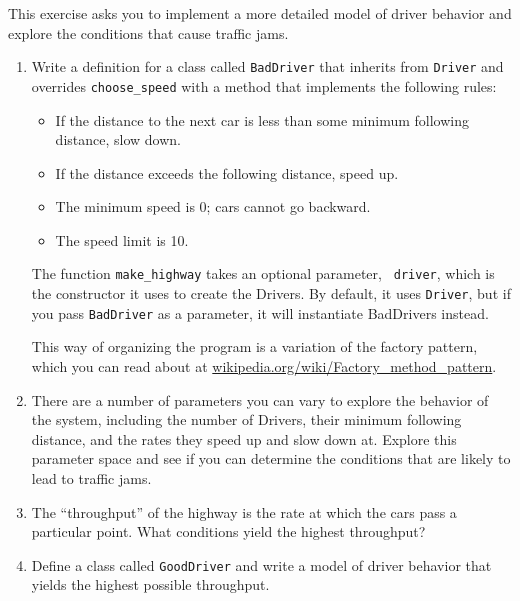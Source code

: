 \documentclass[10pt]{book}
\begin{document}
\begin{ex}

This exercise asks you to implement a more detailed model
of driver behavior and explore the conditions that cause
traffic jams.

\begin{enumerate}

\item Write a definition for a class called {\tt BadDriver}
that inherits from {\tt Driver} and overrides \verb"choose_speed"
with a method that implements the following rules:

\begin{itemize}

\item If the distance to the next car is less than some minimum
following distance, slow down.

\item If the distance exceeds the following distance, speed up.

\item The minimum speed is 0; cars cannot go backward.

\item The speed limit is 10.

\end{itemize}

The function \verb"make_highway" takes an optional parameter, {\tt
  driver}, which is the constructor it uses to create the Drivers.  By
default, it uses {\tt Driver}, but if you pass {\tt BadDriver} as a
parameter, it will instantiate BadDrivers instead.

This way of organizing the program is a variation of the factory
pattern, which you can read about at
\url{wikipedia.org/wiki/Factory_method_pattern}.


\item There are a number of parameters you can vary to explore the
  behavior of the system, including the number of Drivers, their
  minimum following distance, and the rates they speed up and slow
  down at.  Explore this parameter space and see if you can determine
  the conditions that are likely to lead to traffic jams.

\item The ``throughput'' of the highway is the rate at which the cars
  pass a particular point.  What conditions yield the highest
  throughput?

\item Define a class called {\tt GoodDriver} and write a model of
  driver behavior that yields the highest possible throughput.

\end{enumerate}

\end{ex}
\end{document}
